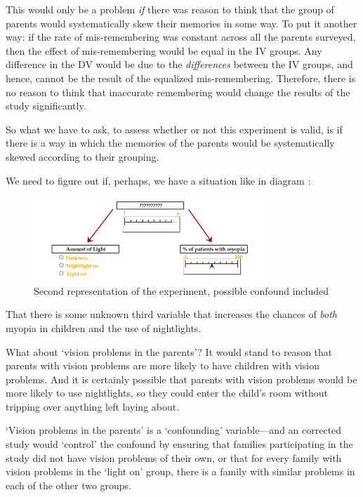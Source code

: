 \begin{refsection}
This would only be a problem \emph{if} there was reason to think that the group of parents would systematically skew their memories in some way. To put it another way: if the rate of mis-remembering was constant across all the parents surveyed, then the effect of mis-remembering would be equal in the IV groups. Any difference in the DV would be due to the \emph{differences} between the IV groups, and hence, cannot be the result of the equalized mis-remembering. Therefore, there is no reason to think that inaccurate remembering would change the results of the study significantly.

So what we have to ask, to assess whether or not this experiment is valid, is if there is a way in which the memories of the parents would be systematically skewed according to their grouping. 

We need to figure out if, perhaps, we have a situation like in diagram :

\begin{figure}\includegraphics{../images/hypothesis3.png}\caption{Second representation of the experiment, possible confound included}\label{fig:hypothesis3}\end{figure}

That there is some unknown third variable that increases the chances of \emph{both} myopia in children and the use of nightlights.

What about ‘vision problems in the parents’? It would stand to reason that parents with vision problems are more likely to have children with vision problems. And it is certainly possible that parents with vision problems would be more likely to use nightlights, so they could enter the child’s room without tripping over anything left laying about.

‘Vision problems in the parents’ is a ‘confounding’ variable---and an corrected study would ‘control’ the confound by ensuring that families participating in the study did not have vision problems of their own, or that for every family with vision problems in the ‘light on’ group, there is a family with similar problems in each of the other two groups.


\end{refsection}
